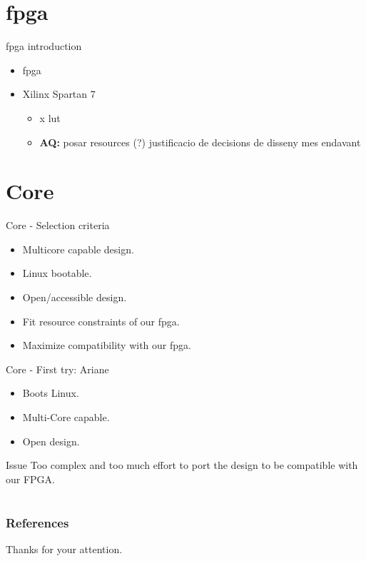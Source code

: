 \documentclass[xcolor=table]{beamer}
\newcommand{\aqnote}[1]{ {\color{violet}\textbf{AQ:} #1 } }
\begin{document}
\section{\acrshort{fpga}}
\begin{frame}{\acrshort{fpga} introduction}
    \begin{itemize}
        \item \acrfull{fpga}
        \item Xilinx Spartan 7 \cite{sp701} \cite{fpga_resources}
            \begin{itemize}
                \item x \gls{lut}
                \item \aqnote{posar resources (?) justificacio de decisions de disseny mes endavant}
            \end{itemize}
    \end{itemize}
\end{frame}

\section{Core}
\begin{frame}{Core - Selection criteria}
  \begin{itemize}
    \item Multicore capable design.
    \item Linux bootable.
    \item Open/accessible design.
    \item Fit resource constraints of our fpga. 
    \item Maximize compatibility with our fpga.
  \end{itemize}
\end{frame}

\begin{frame}{Core - First try: Ariane}
	\begin{itemize}
		\item Boots Linux.
		\item Multi-Core capable.
		\item Open design.
	\end{itemize}

	\begin{alertblock}{Issue}
		Too complex and too much effort to port the design to be compatible with our FPGA.	
	\end{alertblock}
\end{frame}

\section*{}

\begin{frame}[allowframebreaks]
        \frametitle{References}


\end{frame}


\begin{frame}{}
    \centering
    \Large Thanks for your attention.
\end{frame}
\end{document}
